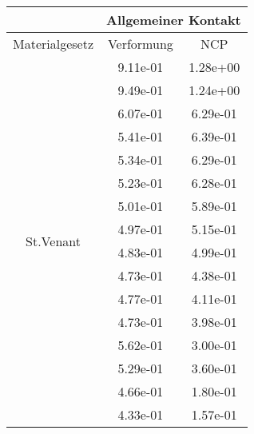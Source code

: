 \begin{table} 
\centering 
\begin{tabular}{c|cc|} 
\cline{2-3} 
 & \multicolumn{2}{|c|}{Allgemeiner Kontakt} \\ 
\hline 
\multicolumn{1}{|c|}{Materialgesetz} & \multicolumn{1}{c|}{Verformung} & \multicolumn{1}{c|}{NCP} \\ 
\hline 
\multicolumn{1}{|c|}{\multirow{23}{*}{St.Venant}} &\multicolumn{1}{|c|}{  9.11e-01} & \multicolumn{1}{|c|}{  1.28e+00} \\ 
\multicolumn{1}{|c|}{} & \multicolumn{1}{|c|}{  9.49e-01} & \multicolumn{1}{|c|}{  1.24e+00} \\ 
\multicolumn{1}{|c|}{} & \multicolumn{1}{|c|}{  6.07e-01} & \multicolumn{1}{|c|}{  6.29e-01} \\ 
\multicolumn{1}{|c|}{} & \multicolumn{1}{|c|}{  5.41e-01} & \multicolumn{1}{|c|}{  6.39e-01} \\ 
\multicolumn{1}{|c|}{} & \multicolumn{1}{|c|}{  5.34e-01} & \multicolumn{1}{|c|}{  6.29e-01} \\ 
\multicolumn{1}{|c|}{} & \multicolumn{1}{|c|}{  5.23e-01} & \multicolumn{1}{|c|}{  6.28e-01} \\ 
\multicolumn{1}{|c|}{} & \multicolumn{1}{|c|}{  5.01e-01} & \multicolumn{1}{|c|}{  5.89e-01} \\ 
\multicolumn{1}{|c|}{} & \multicolumn{1}{|c|}{  4.97e-01} & \multicolumn{1}{|c|}{  5.15e-01} \\ 
\multicolumn{1}{|c|}{} & \multicolumn{1}{|c|}{  4.83e-01} & \multicolumn{1}{|c|}{  4.99e-01} \\ 
\multicolumn{1}{|c|}{} & \multicolumn{1}{|c|}{  4.73e-01} & \multicolumn{1}{|c|}{  4.38e-01} \\ 
\multicolumn{1}{|c|}{} & \multicolumn{1}{|c|}{  4.77e-01} & \multicolumn{1}{|c|}{  4.11e-01} \\ 
\multicolumn{1}{|c|}{} & \multicolumn{1}{|c|}{  4.73e-01} & \multicolumn{1}{|c|}{  3.98e-01} \\ 
\multicolumn{1}{|c|}{} & \multicolumn{1}{|c|}{  5.62e-01} & \multicolumn{1}{|c|}{  3.00e-01} \\ 
\multicolumn{1}{|c|}{} & \multicolumn{1}{|c|}{  5.29e-01} & \multicolumn{1}{|c|}{  3.60e-01} \\ 
\multicolumn{1}{|c|}{} & \multicolumn{1}{|c|}{  4.66e-01} & \multicolumn{1}{|c|}{  1.80e-01} \\ 
\multicolumn{1}{|c|}{} & \multicolumn{1}{|c|}{  4.33e-01} & \multicolumn{1}{|c|}{  1.57e-01} \\ 

\end{tabular}
\end{table}
